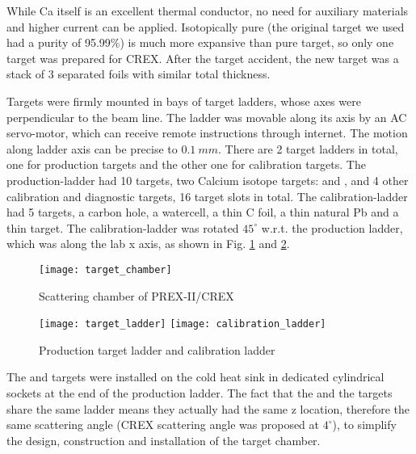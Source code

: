 While Ca itself is an excellent thermal conductor, no need for auxiliary 
materials and higher current can be applied. Isotopically pure \Ca (the original
target we used had a purity of 95.99\%) is much more 
expansive than pure \Pb target, so only one \Ca target was prepared for CREX. 
After the target accident, 
the new \Ca target was a stack of 3 separated foils with similar total thickness.

Targets were firmly mounted in bays of target ladders, whose axes were 
perpendicular to the beam line. The ladder was movable along its axis by an 
AC servo-motor, which can receive remote instructions through internet. 
The motion along ladder axis can be precise to $0.1\ mm$.
There are 2 target ladders in total, one for production targets and the other
one for calibration targets. The production-ladder had 10 \Pb targets, 
two Calcium isotope targets: \ca and \Ca, and 4 other calibration and diagnostic
targets, 16 target slots in total. The calibration-ladder had 5 targets, a carbon 
hole, a watercell, a thin C foil, a thin natural Pb and a thin \ca target.
The calibration-ladder was rotated $45^\circ$ w.r.t. the production ladder, 
which was along the lab x axis, as shown in Fig. \ref{fig:scattering_chamber}
and \ref{fig:target_ladder}.

\begin{figure}[h!]
    \centering
    \texttt{[image: target\_chamber]}
    \caption{Scattering chamber of PREX-II/CREX}
    \label{fig:scattering_chamber}
\end{figure}
\begin{figure}[h!]
    \centering
    \texttt{[image: target\_ladder]}
    \texttt{[image: calibration\_ladder]}
    \caption{Production target ladder and calibration ladder}
    \label{fig:target_ladder}
\end{figure}

The \ca and \Ca targets were installed on the cold heat sink in dedicated cylindrical 
sockets at the end of the production ladder. %
The fact that the \Ca and the \Pb 
targets share the same ladder means they actually had the same z location,
therefore the same scattering angle (CREX scattering angle was proposed at $4^\circ$), 
to simplify the design, construction and installation of the target chamber.

